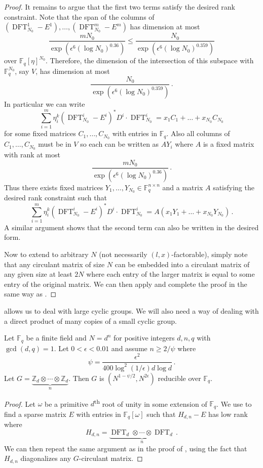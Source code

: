 \documentclass{toc}
\newcommand\F{{\mathbb{F}}}
\renewcommand\Z{{\mathbb{Z}}}
\newcommand{\ts}{\textsuperscript}
\DeclareMathOperator{\DFT}{DFT}
\begin{document}
\begin{proof}
It remains to argue that the first two terms satisfy the desired rank constraint.  Note that the span of the columns of 
%
$(\DFT_{N_0}^1 - E^1), \dots , (\DFT_{N_0}^m - E^m)$
%
has dimension at most 
\[
\frac{mN_0}{\exp\left(\epsilon^6(\log N_0)^{0.36}\right)} \leq \frac{N_0}{\exp\left(\epsilon^6(\log N_0)^{0.359}\right)}
\]
over $\F_q[\eta]^{N_0}$.  Therefore, the dimension of the intersection of this subspace with $\F_q^{N_0}$, say $V$, has dimension at most 
\[
\frac{N_0}{\exp\left(\epsilon^6(\log N_0)^{0.359}\right)} \,.
\]
In particular we can write
%
%
%
%
\[
\sum_{i=1}^m \eta_i^k(\DFT_{N_0}^i - E^i)^*D^i\cdot \DFT_{N_0}^i = x_1C_1  + \dots  + x_{N_0}C_{N_0}
\]
%
for some fixed matrices $C_1, \dots , C_{N_0}$ with entries %
in %
$\F_q$.  Also all columns of $C_1, \dots , C_{N_0}$ must be in $V$ so each can be written as $AY_i$ where $A$ is a fixed matrix with rank at most \[\frac{mN_0}{\exp\left(\epsilon^6(\log N_0)^{0.36}\right)} \,.\]  Thus there exists fixed matrices $Y_1, \dots , Y_{N_0} \in \F_q^{n \times n}$ and a matrix $A$ satisfying the desired rank constraint such that
%
%
%
%
\[
\sum_{i=1}^m \eta_i^k(\DFT_{N_0}^i - E^i)^*D^i \cdot \DFT_{N_0}^i = A(x_1Y_1 + \dots + x_{N_0}Y_{N_0}) \,.
\]
%
A similar argument shows that the second term can also be written in the desired form.

Now to extend to arbitrary $N$ (not necessarily $(l,x)$-factorable),
simply note that any circulant matrix of size $N$ can be embedded
into a circulant matrix of
any given  %
size at least $2N$ where
%
%
each entry of the larger matrix is equal to some entry %
of the original matrix.  
We can then apply  and complete the proof in the same way as .
\end{proof}


 allows us to deal with large cyclic groups.  We will also need a way of dealing with a direct product of many copies of a small cyclic group.  
\begin{claim}\label{smallgroups}
Let $\F_q$ be a finite field and $N = d^n$ for positive integers $d,n,q$ with $\gcd(d,q) = 1$.  Let $0 < \epsilon < 0.01 $ and assume $n \geq 2/\psi$ where \[\psi = \frac{\epsilon^2 }{400\log^2 (1/\epsilon) d \log d} \,.\]  Let $G = \underbrace{\Z_d \otimes \cdots \otimes \Z_d}_{n}$. Then $G$ is $\left(N^{1 - \psi/2},  N^{ 2\epsilon} \right)$ reducible over $\F_q$.
\end{claim}
\begin{proof}
Let $\omega$ be a primitive $d$\ts{th} root of unity in some extension of $\F_q$.  We use  to find a sparse matrix $E$ with entries in  $\F_q[\omega]$ such that $H_{d,n} - E$ has low rank where
\[
H_{d,n} = \underbrace{\DFT_d \otimes \cdots \otimes \DFT_d}_{n} \,.
\]
We can then repeat the same argument as in the proof of , using the fact that $H_{d,n}$ diagonalizes any $G$-circulant matrix.
\end{proof}
\end{document}
